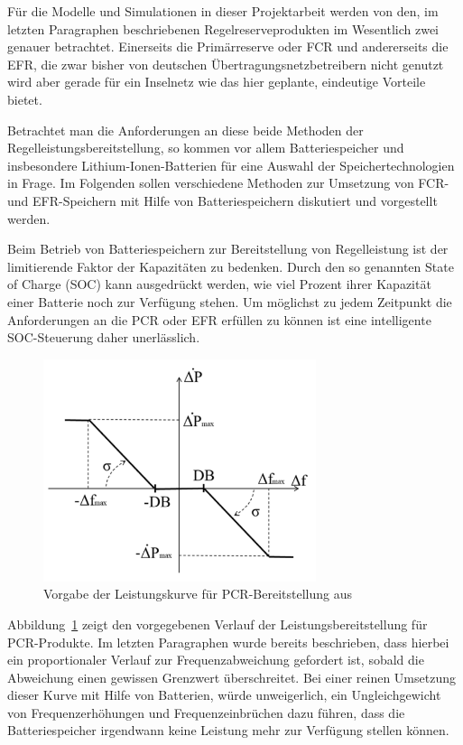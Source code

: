 Für die Modelle und Simulationen in dieser Projektarbeit werden von den, im letzten Paragraphen beschriebenen Regelreserveprodukten
im Wesentlich zwei genauer betrachtet.
Einerseits die Primärreserve oder FCR und andererseits die EFR, die zwar bisher von deutschen Übertragungsnetzbetreibern nicht genutzt wird
aber gerade für ein Inselnetz wie das hier geplante, eindeutige Vorteile bietet.

Betrachtet man die Anforderungen an diese beide Methoden der Regelleistungsbereitstellung, so kommen vor allem
Batteriespeicher und insbesondere Lithium-Ionen-Batterien für eine Auswahl der Speichertechnologien in Frage.
Im Folgenden sollen verschiedene Methoden zur Umsetzung von FCR- und EFR-Speichern mit Hilfe von Batteriespeichern 
diskutiert und vorgestellt werden.

Beim Betrieb von Batteriespeichern zur Bereitstellung von Regelleistung ist der limitierende Faktor der Kapazitäten zu bedenken.
Durch den so genannten State of Charge (SOC) kann ausgedrückt werden, wie viel Prozent ihrer Kapazität einer Batterie noch zur Verfügung stehen.
Um möglichst zu jedem Zeitpunkt die Anforderungen an die PCR oder EFR erfüllen zu können ist eine intelligente
SOC-Steuerung daher unerlässlich.

\begin{figure}[h!]
    \centering
    \includegraphics[width=8cm]{Abbildungen/DroopControl.png}
    \caption{Vorgabe der Leistungskurve für PCR-Bereitstellung aus~\parencite[Kap. 3]{noauthor_soc_nodate}}\label{Droop}
\end{figure}

Abbildung~\ref{Droop} zeigt den vorgegebenen Verlauf der Leistungsbereitstellung für PCR-Produkte.
Im letzten Paragraphen wurde bereits beschrieben, dass hierbei ein proportionaler Verlauf zur Frequenzabweichung 
gefordert ist, sobald die Abweichung einen gewissen Grenzwert überschreitet.
Bei einer reinen Umsetzung dieser Kurve mit Hilfe von Batterien, würde unweigerlich, ein Ungleichgewicht von 
Frequenzerhöhungen und Frequenzeinbrüchen dazu führen, dass die Batteriespeicher irgendwann keine Leistung mehr
zur Verfügung stellen können.

